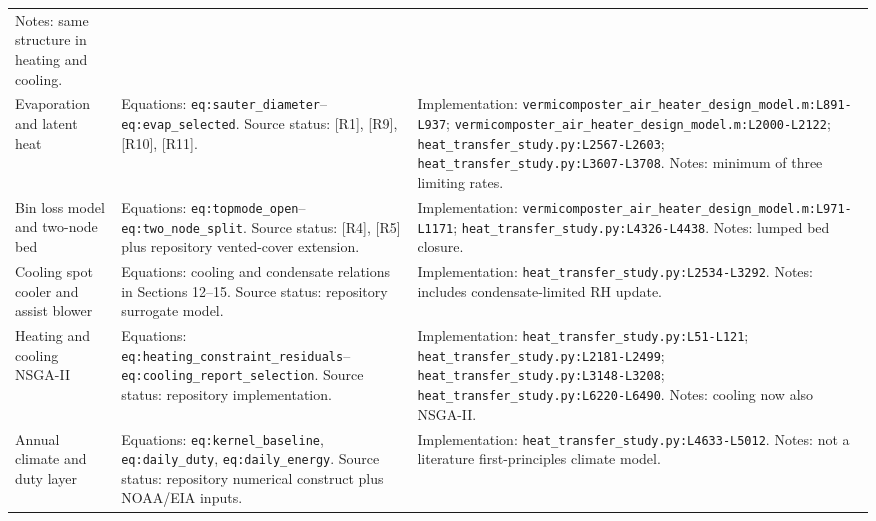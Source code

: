 \documentclass[11pt]{article}
\newcommand{\srcref}[1]{\nolinkurl{#1}}
\newcommand{\code}[1]{\nolinkurl{#1}}
\begin{document}
\begin{longtable}{@{}L{0.16\textwidth}L{0.28\textwidth}L{0.48\textwidth}@{}}
Notes: same structure in heating and cooling. \\
Evaporation and latent heat &
Equations: \code{eq:sauter\_diameter}--\code{eq:evap\_selected}. \newline
Source status: [R1], [R9], [R10], [R11]. &
Implementation: \srcref{vermicomposter_air_heater_design_model.m:L891-L937}; \srcref{vermicomposter_air_heater_design_model.m:L2000-L2122}; \srcref{heat_transfer_study.py:L2567-L2603}; \srcref{heat_transfer_study.py:L3607-L3708}. \newline
Notes: minimum of three limiting rates. \\
Bin loss model and two-node bed &
Equations: \code{eq:topmode\_open}--\code{eq:two\_node\_split}. \newline
Source status: [R4], [R5] plus repository vented-cover extension. &
Implementation: \srcref{vermicomposter_air_heater_design_model.m:L971-L1171}; \srcref{heat_transfer_study.py:L4326-L4438}. \newline
Notes: lumped bed closure. \\
Cooling spot cooler and assist blower &
Equations: cooling and condensate relations in Sections 12--15. \newline
Source status: repository surrogate model. &
Implementation: \srcref{heat_transfer_study.py:L2534-L3292}. \newline
Notes: includes condensate-limited RH update. \\
Heating and cooling NSGA-II &
Equations: \code{eq:heating\_constraint\_residuals}--\code{eq:cooling\_report\_selection}. \newline
Source status: repository implementation. &
Implementation: \srcref{heat_transfer_study.py:L51-L121}; \srcref{heat_transfer_study.py:L2181-L2499}; \srcref{heat_transfer_study.py:L3148-L3208}; \srcref{heat_transfer_study.py:L6220-L6490}. \newline
Notes: cooling now also NSGA-II. \\
Annual climate and duty layer &
Equations: \code{eq:kernel\_baseline}, \code{eq:daily\_duty}, \code{eq:daily\_energy}. \newline
Source status: repository numerical construct plus NOAA/EIA inputs. &
Implementation: \srcref{heat_transfer_study.py:L4633-L5012}. \newline
Notes: not a literature first-principles climate model. \\
\bottomrule
\end{longtable}
\endgroup
\end{document}
